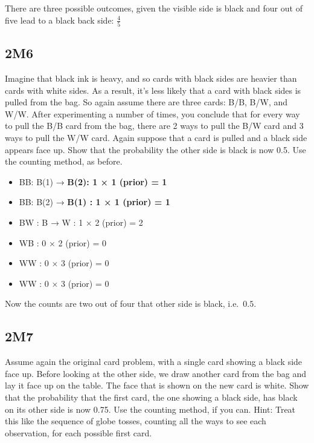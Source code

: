 \documentclass[
]{book}
\providecommand{\tightlist}{%
  \setlength{\itemsep}{0pt}\setlength{\parskip}{0pt}}
\begin{document}
There are three possible outcomes, given the visible side is black and four out of five lead to a black back side: \(\frac{4}{5}\)

\hypertarget{m6}{%
\subsection*{2M6}\label{m6}}

Imagine that black ink is heavy, and so cards with black sides are heavier than cards with white sides. As a result, it's less likely that a card with black sides is pulled from the bag. So again assume there are three cards: B/B, B/W, and W/W. After experimenting a number of times, you conclude that for every way to pull the B/B card from the bag, there are 2 ways to pull the B/W card and 3 ways to pull the W/W card. Again suppose that a card is pulled and a black side appears face up. Show that the probability the other side is black is now 0.5. Use the counting method, as before.

\begin{itemize}
\tightlist
\item
  B\textbar B: B(1) → \textbf{B(2): 1 × 1 (prior) = 1}
\item
  B\textbar B: B(2) → \textbf{B(1) : 1 × 1 (prior) = 1}
\item
  B\textbar W : B → W : 1 × 2 (prior) = 2
\item
  W\textbar B : 0 × 2 (prior) = 0
\item
  W\textbar W : 0 × 3 (prior) = 0
\item
  W\textbar W : 0 × 3 (prior) = 0
\end{itemize}

Now the counts are two out of four that other side is black, i.e.~\(0.5\).

\hypertarget{m7}{%
\subsection*{2M7}\label{m7}}

Assume again the original card problem, with a single card showing a black side face up. Before looking at the other side, we draw another card from the bag and lay it face up on the table. The face that is shown on the new card is white. Show that the probability that the first card, the one showing a black side, has black on its other side is now 0.75. Use the counting method, if you can. Hint: Treat this like the sequence of globe tosses, counting all the ways to see each observation, for each possible first card.
\end{document}
